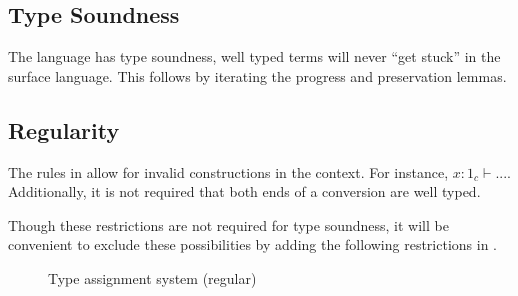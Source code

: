 \subsection{Type Soundness}

The language has type soundness, well typed terms will never ``get stuck'' in the surface language.
This follows by iterating the progress and preservation lemmas.




\subsection{Regularity}
The rules in  allow for invalid constructions in the context.
For instance, $x:1_{c}\vdash...$.
Additionally, it is not required that both ends of a conversion are well typed.

Though these restrictions are not required for type soundness, it will be convenient to exclude these possibilities by adding the following restrictions in .


\begin{figure}









\caption{Type assignment system (regular)}
\label{fig:surface-tas-reg}
\end{figure}

